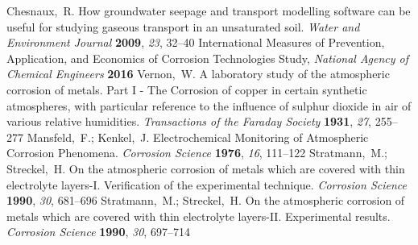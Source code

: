 \documentclass[aps,prl,twocolumn,superscriptaddress,groupedaddress]{revtex4}
\begin{document}
\begin{mcitethebibliography}{88}
\mciteBstWouldAddEndPuncttrue
\mciteSetBstMidEndSepPunct{\mcitedefaultmidpunct}
{\mcitedefaultendpunct}{\mcitedefaultseppunct}\relax
\EndOfBibitem
{}
Chesnaux,~R. How groundwater seepage and transport modelling software can be
  useful for studying gaseous transport in an unsaturated soil. \emph{Water and
  Environment Journal} \textbf{2009}, \emph{23}, 32--40\relax
\mciteBstWouldAddEndPuncttrue
\mciteSetBstMidEndSepPunct{\mcitedefaultmidpunct}
{\mcitedefaultendpunct}{\mcitedefaultseppunct}\relax
\EndOfBibitem
International Measures of Prevention, Application, and Economics of Corrosion Technologies Study, \emph{National Agency of Chemical Engineers} \textbf{2016}
\relax
\mciteBstWouldAddEndPuncttrue
\mciteSetBstMidEndSepPunct{\mcitedefaultmidpunct}
{\mcitedefaultendpunct}{\mcitedefaultseppunct}\relax
\EndOfBibitem
{}
Vernon,~W. A laboratory study of the atmospheric corrosion of metals. Part
  I - The Corrosion of copper in certain synthetic atmospheres, with
  particular reference to the influence of sulphur dioxide in air of various
  relative humidities. \emph{Transactions of the Faraday Society}
  \textbf{1931}, \emph{27}, 255--277\relax
\mciteBstWouldAddEndPuncttrue
\mciteSetBstMidEndSepPunct{\mcitedefaultmidpunct}
{\mcitedefaultendpunct}{\mcitedefaultseppunct}\relax
\EndOfBibitem
{}
Mansfeld,~F.; Kenkel,~J. Electrochemical Monitoring of Atmospheric Corrosion
  Phenomena. \emph{Corrosion Science} \textbf{1976}, \emph{16}, 111--122\relax
\mciteBstWouldAddEndPuncttrue
\mciteSetBstMidEndSepPunct{\mcitedefaultmidpunct}
{\mcitedefaultendpunct}{\mcitedefaultseppunct}\relax
\EndOfBibitem
{}
Stratmann,~M.; Streckel,~H. On the atmospheric corrosion of metals which are
  covered with thin electrolyte layers-I. Verification of the experimental
  technique. \emph{Corrosion Science} \textbf{1990}, \emph{30}, 681--696\relax
\mciteBstWouldAddEndPuncttrue
\mciteSetBstMidEndSepPunct{\mcitedefaultmidpunct}
{\mcitedefaultendpunct}{\mcitedefaultseppunct}\relax
\EndOfBibitem
{}
Stratmann,~M.; Streckel,~H. On the atmospheric corrosion of metals which are
  covered with thin electrolyte layers-II. Experimental results.
  \emph{Corrosion Science} \textbf{1990}, \emph{30}, 697--714\relax
\mciteBstWouldAddEndPuncttrue
\mciteSetBstMidEndSepPunct{\mcitedefaultmidpunct}

\end{mcitethebibliography}
\end{document}
